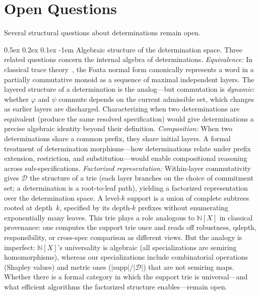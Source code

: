 \documentclass[acmsmall,review,anonymous]{acmart}
\makeatletter
\renewcommand{\paragraph}{\@startsection{paragraph}{4}{\z@}%
  {0.5ex \@plus 0.2ex \@minus 0.1ex}%
  {-1em}%
  {\normalfont\normalsize\bfseries}}
\theoremstyle{remark}
\numberwithin{definition}{section}
\numberwithin{theorem}{section}
\numberwithin{lemma}{section}
\numberwithin{corollary}{section}
\numberwithin{remark}{section}
\numberwithin{example}{section}
\numberwithin{observation}{section}
\numberwithin{assumption}{section}
\makeatother
\begin{document}
\section{Open Questions}
\label{app:open-questions}

Several structural questions about determinations remain open.

\paragraph{Algebraic structure of the determination space.}
Three related questions concern the internal algebra of determinations.
\emph{Equivalence:}
In classical trace theory~\cite{mazurkiewicz1977concurrent}, the Foata
normal form canonically represents a word in a partially commutative
monoid as a sequence of maximal independent layers.
The layered structure of a determination is the analog---but commutation
is \emph{dynamic}: whether $\varphi$ and $\psi$ commute depends on the
current admissible set, which changes as earlier layers are discharged.
Characterizing when two determinations are equivalent (produce the same
resolved specification) would give determinations a precise algebraic
identity beyond their definition.
\emph{Composition:}
When two determinations share a common prefix, they share initial
layers.
A formal treatment of determination morphisms---how determinations
relate under prefix extension, restriction, and substitution---would
enable compositional reasoning across sub-specifications.
\emph{Factorized representation:}
Within-layer commutativity gives $\mathcal{D}$ the structure of a trie
(each layer branches on the choice of commitment set; a determination
is a root-to-leaf path), yielding a factorized
representation~\cite{olteanu2015factorized} over the determination
space.
A level-$k$ support is a union of complete subtrees rooted at
depth~$k$, specified by its depth-$k$ prefixes without enumerating
exponentially many leaves.
This trie plays a role analogous to $\mathbb{N}[X]$ in classical
provenance: one computes the support trie once and reads off robustness,
qdepth, responsibility, or cross-spec comparison as different views.
But the analogy is imperfect: $\mathbb{N}[X]$'s universality is
algebraic (all specializations are semiring homomorphisms), whereas
our specializations include combinatorial operations (Shapley values)
and metric ones ($|\mathrm{supp}|/|\mathcal{D}|$) that are not
semiring maps.
Whether there is a formal category in which the support trie is
universal---and what efficient algorithms the factorized structure
enables---remain open.
\end{document}
